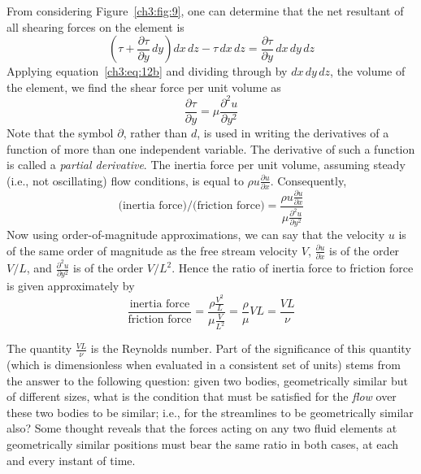 From considering Figure~\ref{ch3:fig:9}, one can determine that the net resultant
of all shearing forces on the element is
\begin{equation}\label{ch3:eq:13}
\left(\tau + \frac{\partial\tau}{\partial y}\,dy\right)dx\,dz - \tau\,dx\,dz
  = \frac{\partial\tau}{\partial y}\,dx\,dy\,dz
\end{equation}
Applying equation~\eqref{ch3:eq:12b} and dividing through by $dx\,dy\,dz$, the
volume of the element, we find the shear force per unit volume as
\begin{equation}\label{ch3:eq:14}
\frac{\partial\tau}{\partial y} = \mu\frac{\partial^{2}u}{\partial y^{2}}
\end{equation}
Note that the symbol $\partial$, rather than $d$, is used in writing the
derivatives of a function of more than one independent variable. The derivative of
such a function is called a \emph{partial derivative}. The inertia force per unit
volume, assuming steady (i.e., not oscillating) flow conditions, is equal to
$\rho u\frac{\partial u}{\partial x}$. Consequently,
\begin{equation}\label{ch3:eq:15}
\text{(inertia force)/(friction force)}
  = \frac{\rho u\frac{\partial u}{\partial x}}{\mu\frac{\partial^{2}u}{\partial y^{2}}}
\end{equation}
Now using order-of-magnitude approximations, we can say that the velocity $u$ is of
the same order of magnitude as the free stream velocity $V$,
$\frac{\partial u}{\partial x}$ is of the order $V/L$, and
$\frac{\partial^{2}u}{\partial y^{2}}$ is of the order $V/L^{2}$. Hence the ratio
of inertia force to friction force is given approximately by
\begin{equation}\label{ch3:eq:16}
\frac{\text{inertia force}}{\text{friction force}}
  = \frac{\rho\frac{V^{2}}{L}}{\mu\frac{V}{L^{2}}}
  = \frac{\rho}{\mu}VL = \frac{VL}{\nu}
\end{equation}

The quantity $\frac{VL}{\nu}$ is the Reynolds number. Part of the significance of
this quantity (which is dimensionless when evaluated in a consistent set of units)
stems from the answer to the following question: given two bodies, geometrically
similar but of different sizes, what is the condition that must be satisfied for
the \emph{flow} over these two bodies to be similar; i.e., for the streamlines to be
geometrically similar also? Some thought reveals that the forces acting on any two
fluid elements at geometrically similar positions must bear the same ratio in both
cases, at each and every instant of time.

